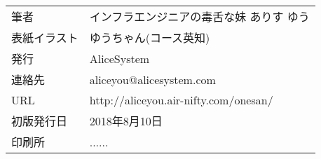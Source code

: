 \thispagestyle{empty}
\mbox{}
\newpage
\clearpage


\thispagestyle{empty}

\vspace*{\fill}
\begin{tabular}{ll} \toprule
筆者 & インフラエンジニアの毒舌な妹 ありす ゆう \\
表紙イラスト & ゆうちゃん(コース英知) \\
発行 & AliceSystem \\
連絡先 & aliceyou@alicesystem.com \\
URL & http://aliceyou.air-nifty.com/onesan/ \\
初版発行日 & 2018年8月10日 \\
印刷所 & ...... \\ \bottomrule
\end{tabular}